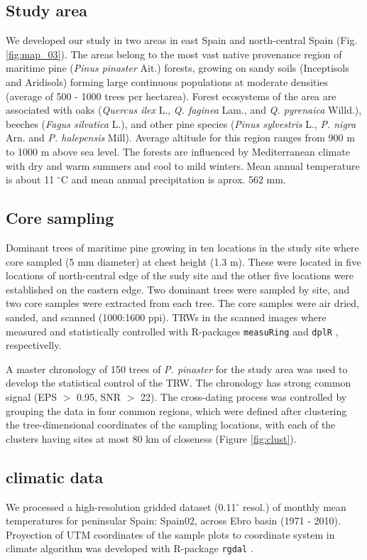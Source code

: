 \documentclass[review,authoryear]{elsarticle}
\begin{document}
\subsection{Study area}
We developed our study in two areas in east Spain and north-central
Spain (Fig. \ref{fig:map_03}). The areas belong to the most vast
native provenance region of maritime pine (\textit{Pinus pinaster}
Ait.) forests, growing on sandy soils (Inceptisols and Aridisols)
forming large continuous populations at moderate densities (average of
500 - 1000 trees per hectarea). Forest ecosystems of the area are
associated with oaks (\textit{Quercus ilex} L., \textit{Q. faginea}
Lam., and \textit{Q. pyrenaica} Willd.), beeches (\textit{Fagus
  silvatica} L.), and other pine species (\textit{Pinus sylvestris}
L., \textit{P. nigra} Arn. and \textit{P.  halepensis} Mill). Average
altitude for this region ranges from 900 m to 1000 m above sea
level. The forests are influenced by Mediterranean climate with dry
and warm summers and cool to mild winters. Mean annual temperature is
about 11 $^{\circ}$C and mean annual precipitation is aprox. 562 mm.

\subsection{Core sampling}
Dominant trees of maritime pine growing in ten locations in the study
site where core sampled (5 mm diameter) at chest height (1.3 m). These
were located in five locations of north-central edge of the sudy site
and the other five locations were established on the eastern edge. Two
dominant trees were sampled by site, and two core samples were
extracted from each tree. The core samples were air dried, sanded, and
scanned (1000:1600 ppi). \glspl{TRW} in the scanned images where
measured and statistically controlled with R-packages {\tt measuRing}
\citep{Lara2015} and {\tt dplR} \citep{Bunn2010}, respectivelly.

A master chronology of 150 trees of \textit{P. pinaster} for the study
area \citep{Bogino2008} was used to develop the statistical control of
the \gls{TRW}. The chronology has strong common signal (EPS $>$ 0.95,
SNR $>$ 22). The cross-dating process was controlled by grouping the
data in four common regions, which were defined after clustering the
tree-dimensional coordinates of the sampling locations, with each of
the clusters having sites at most 80 km of closeness (Figure
\ref{fig:clust}).

\subsection{climatic data}
We processed a high-resolution gridded dataset (0.11$^{\circ}$ resol.)
of monthly mean temperatures for peninsular Spain: Spain02,
\citep{Herrera2015} across Ebro basin (1971 - 2010). Proyection of UTM
coordinates of the sample plots to coordinate system in climate
algorithm was developed with R-package {\tt rgdal}
\citep{Bivand2015}. %
\end{document}
